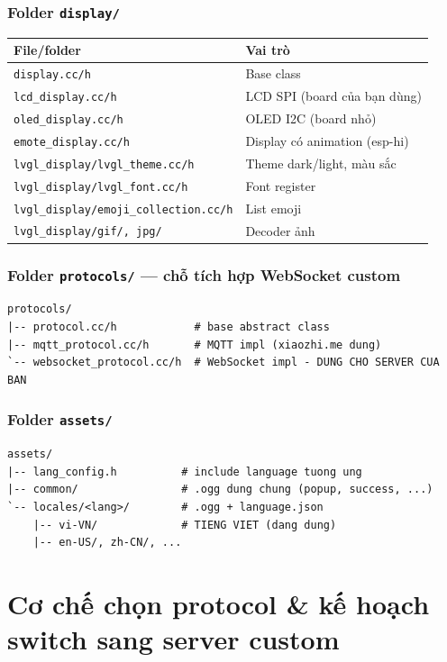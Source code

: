 \documentclass[11pt,a4paper]{article}
\begin{document}
\subsubsection{Folder \texttt{display/}}
\begin{tabularx}{\textwidth}{l|Y}
\toprule
\textbf{File/folder} & \textbf{Vai trò}\\
\midrule
\texttt{display.cc/h} & Base class\\
\texttt{lcd\_display.cc/h} & LCD SPI (board của bạn dùng)\\
\texttt{oled\_display.cc/h} & OLED I2C (board nhỏ)\\
\texttt{emote\_display.cc/h} & Display có animation (esp-hi)\\
\texttt{lvgl\_display/lvgl\_theme.cc/h} & Theme dark/light, màu sắc\\
\texttt{lvgl\_display/lvgl\_font.cc/h} & Font register\\
\texttt{lvgl\_display/emoji\_collection.cc/h} & List emoji\\
\texttt{lvgl\_display/gif/, jpg/} & Decoder ảnh\\
\bottomrule
\end{tabularx}

\subsubsection{Folder \texttt{protocols/} — chỗ tích hợp WebSocket custom}
\begin{lstlisting}
protocols/
|-- protocol.cc/h            # base abstract class
|-- mqtt_protocol.cc/h       # MQTT impl (xiaozhi.me dung)
`-- websocket_protocol.cc/h  # WebSocket impl - DUNG CHO SERVER CUA BAN
\end{lstlisting}

\subsubsection{Folder \texttt{assets/}}
\begin{lstlisting}
assets/
|-- lang_config.h          # include language tuong ung
|-- common/                # .ogg dung chung (popup, success, ...)
`-- locales/<lang>/        # .ogg + language.json
    |-- vi-VN/             # TIENG VIET (dang dung)
    |-- en-US/, zh-CN/, ...
\end{lstlisting}

\section{Cơ chế chọn protocol \& kế hoạch switch sang server custom}
\end{document}
